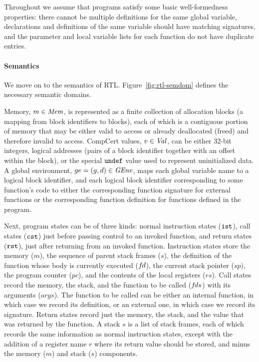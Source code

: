 Throughout we assume that programs satisfy some basic well-formedness properties: there cannot be
multiple definitions for the same global variable, declarations and definitions of the same variable
should have matching signatures, and the parameter and local variable lists for each function do not
have duplicate entries.


\paragraph{Semantics}




We move on to the semantics of RTL.  Figure~\ref{fig:rtl-semdom} defines the necessary semantic
domains.

Memory, $m\in\mathit{Mem}$, is represented as a finite collection of allocation blocks (a mapping from
block identifiers to blocks), each of which is a contiguous portion of memory that may be either
valid to access or already deallocated (freed) and therefore invalid to access.  CompCert values,
$v\in\mathit{Val}$, can be either 32-bit integers, logical addresses (pairs of a block identifier
together with an offset within the block), or the special $\mathtt{undef}$ value used to represent
uninitialized data.  A global environment, $ge=(g,d)\in\mathit{GEnv}$, maps each global variable name to
a logical block identifier, and each logical block identifier corresponding to some function's code
to either the corresponding function signature for external functions or the corresponding function
definition for functions defined in the program.

Next, program states can be of three kinds: normal instruction states ($\mathtt{ist}$), call states
($\mathtt{cst}$) just before passing control to an invoked function, and return states ($\mathtt{rst}$), just
after returning from an invoked function.  Instruction states store the memory ($m$), the sequence
of parent stack frames ($s$), the definition of the function whose body is currently executed
(${f\hspace*{-1pt}d}$), the current stack pointer ($sp$), the program counter ($pc$), and the contents of the
local registers ($rs$).  Call states record the memory, the stack, and the function to be called
(${f\hspace*{-1pt}ds}$) with its arguments ($args$).  The function to be called can be either an internal
function, in which case we record its definition, or an external one, in which case we record its
signature.  Return states record just the memory, the stack, and the value that was returned by the
function.  A stack $s$ is a list of stack frames, each of which records the same information as
normal instruction states, except with the addition of a register name $r$ where its return value
should be stored, and minus the memory ($m$) and stack ($s$) components.

